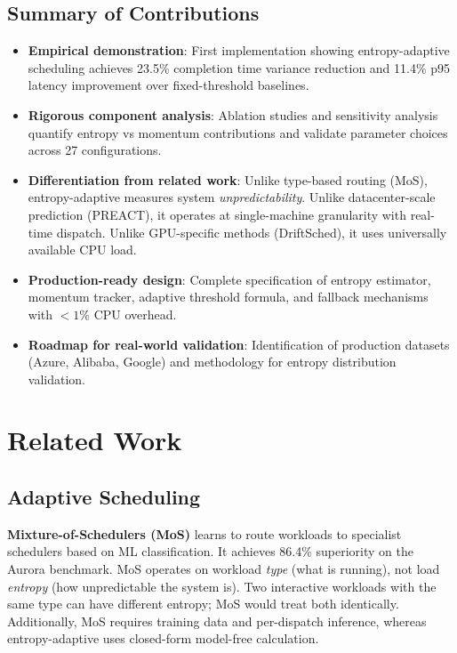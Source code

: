 \documentclass[11pt,letterpaper]{article}
\begin{document}
\subsection{Summary of Contributions}

\begin{itemize}
  \item \textbf{Empirical demonstration}: First implementation showing entropy-adaptive scheduling achieves 23.5\% completion time variance reduction and 11.4\% p95 latency improvement over fixed-threshold baselines.

  \item \textbf{Rigorous component analysis}: Ablation studies and sensitivity analysis quantify entropy vs momentum contributions and validate parameter choices across 27 configurations.

  \item \textbf{Differentiation from related work}: Unlike type-based routing (MoS), entropy-adaptive measures system \textit{unpredictability}. Unlike datacenter-scale prediction (PREACT), it operates at single-machine granularity with real-time dispatch. Unlike GPU-specific methods (DriftSched), it uses universally available CPU load.

  \item \textbf{Production-ready design}: Complete specification of entropy estimator, momentum tracker, adaptive threshold formula, and fallback mechanisms with $<1\%$ CPU overhead.

  \item \textbf{Roadmap for real-world validation}: Identification of production datasets (Azure, Alibaba, Google) and methodology for entropy distribution validation.
\end{itemize}

\section{Related Work}

\subsection{Adaptive Scheduling}

\textbf{Mixture-of-Schedulers (MoS)} \cite{Wang2025} learns to route workloads to specialist schedulers based on ML classification. It achieves 86.4\% superiority on the Aurora benchmark. MoS operates on workload \textit{type} (what is running), not load \textit{entropy} (how unpredictable the system is). Two interactive workloads with the same type can have different entropy; MoS would treat both identically. Additionally, MoS requires training data and per-dispatch inference, whereas entropy-adaptive uses closed-form model-free calculation.
\end{document}
